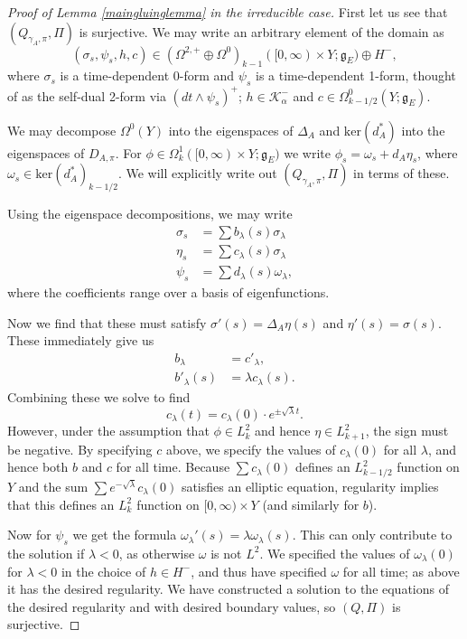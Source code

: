\documentclass[10pt,a4paper]{amsart}
\theoremstyle{definition}
\theoremstyle{remark}
\numberwithin{figure}{qchap}
\begin{document}
\begin{proof}[Proof of Lemma \ref{maingluinglemma} in the irreducible case]
First let us see that $(Q_{\gamma_A,\pi}, \Pi)$ is surjective. We may write an arbitrary element of the domain as $$(\sigma_s, \psi_s, h, c) \in (\Omega^{2,+} \oplus\Omega^0)_{k-1}([0,\infty) \times Y; \mathfrak g_E) \oplus H^-,$$ where $\sigma_s$ is a time-dependent $0$-form and $\psi_s$ is a time-dependent 1-form, thought of as the self-dual 2-form via $(dt \wedge \psi_s)^+$; $h \in \mathcal K^-_\alpha$ and $c \in \Omega^0_{k-1/2}(Y;\mathfrak g_E)$.

We may decompose $\Omega^0(Y)$ into the eigenspaces of $\Delta_A$ and $\text{ker}(d_A^*)$ into the eigenspaces of $D_{A,\pi}$. For $\phi \in \Omega^1_k([0, \infty) \times Y;\mathfrak g_E)$ we write $\phi_s = \omega_s + d_A \eta_s$, where $\omega_s \in \text{ker}(d_A^*)_{k-1/2}$. We will explicitly write out $(Q_{\gamma_A,\pi}, \Pi)$ in terms of these. 

Using the eigenspace decompositions, we may write 
\begin{align*}\sigma_s &= \sum b_\lambda(s) \sigma_\lambda \\
\eta_s &= \sum c_\lambda(s) \sigma_\lambda \\
\psi_s &= \sum d_\lambda(s) \omega_\lambda,
\end{align*}
where the coefficients range over a basis of eigenfunctions.

Now we find that these must satisfy $\sigma'(s) = \Delta_A \eta(s)$ and $\eta'(s) = \sigma(s)$. These immediately give us
\begin{align*}b_\lambda &= c'_\lambda, \\
b'_\lambda(s) &= \lambda c_\lambda(s).\end{align*}
Combining these we solve to find 
$$c_\lambda(t) = c_\lambda(0) \cdot e^{\pm \sqrt{\lambda} t}.$$ 
However, under the assumption that $\phi \in L^2_k$ and hence $\eta \in L^2_{k+1}$, the sign must be negative. By specifying $c$ above, we specify the values of $c_\lambda(0)$ for all $\lambda$, and hence both $b$ and $c$ for all time. Because $\sum c_\lambda(0)$ defines an $L^2_{k-1/2}$ function on $Y$ and the sum $\sum e^{-\sqrt{\lambda}} c_\lambda(0)$ satisfies an elliptic equation, regularity implies that this defines an $L^2_k$ function on $[0,\infty) \times Y$ (and similarly for $b$).

Now for $\psi_s$ we get the formula $\omega_\lambda'(s) = \lambda \omega_\lambda(s)$. This can only contribute to the solution if $\lambda < 0$, as otherwise $\omega$ is not $L^2$. We specified the values of $\omega_\lambda(0)$ for $\lambda < 0$ in the choice of $h \in H^-$, and thus have specified $\omega$ for all time; as above it has the desired regularity. We have constructed a solution to the equations of the desired regularity and with desired boundary values, so $(Q,\Pi)$ is surjective. 


\end{proof}
\end{document}
